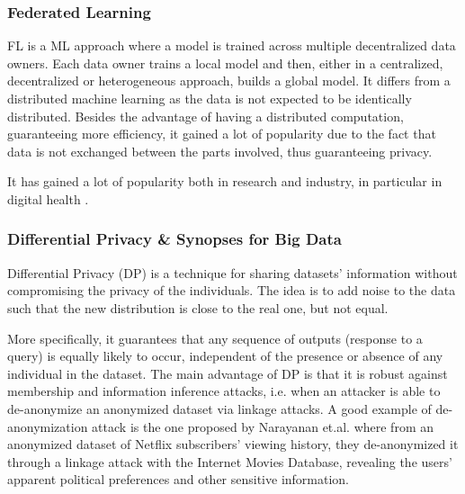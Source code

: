 \documentclass[12pt]{article}
\begin{document}
\subsubsection{Federated Learning}
FL is a ML approach where a model is trained across multiple decentralized data owners. Each data owner trains a local model and then, 
either in a centralized, decentralized or heterogeneous approach, builds a global model. It differs from a distributed machine learning 
as the data is not expected to be identically distributed. Besides the advantage of having a distributed computation, 
guaranteeing more efficiency, it gained a lot of popularity due to the fact that data is not exchanged between the parts involved, thus guaranteeing privacy.

It has gained a lot of popularity both in research and industry, in particular in digital health \cite*{Prayitno2021}.
\subsubsection{Differential Privacy \& Synopses for Big Data}
Differential Privacy (DP) is a technique for sharing datasets' information without compromising the privacy of the individuals. 
The idea is to add noise to the data such that the new distribution is close to the real one, but not equal. 

More specifically, it guarantees that any sequence of outputs (response to a query) is equally likely 
to occur, independent of the presence or absence of any individual in the dataset. The main advantage of DP is that it is robust 
against membership and information inference attacks, i.e. when an attacker is able to de-anonymize an anonymized dataset via 
linkage attacks. A good example of de-anonymization attack is the one proposed by Narayanan et.al. \cite*{Nara2008} where from an 
anonymized dataset of Netflix subscribers' viewing history, they de-anonymized it through a linkage attack with the Internet Movies Database, 
revealing the users' apparent political preferences and other sensitive information.
\end{document}
